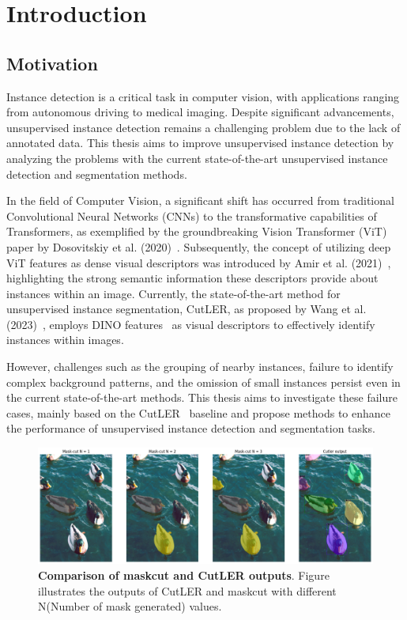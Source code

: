 \chapter{Introduction}\label{chap:introduction}

\section{Motivation}
Instance detection is a critical task in computer vision, with applications ranging from autonomous driving to medical imaging. Despite significant advancements, unsupervised instance detection remains a challenging problem due to the lack of annotated data. This thesis aims to improve unsupervised instance detection by analyzing the problems with the current state-of-the-art unsupervised instance detection and segmentation methods.

In the field of Computer Vision, a significant shift has occurred from traditional Convolutional Neural Networks (CNNs) to the transformative capabilities of Transformers, as exemplified by the groundbreaking Vision Transformer (ViT) paper by Dosovitskiy et al. (2020)~\cite{dosovitskiy2020image}. Subsequently, the concept of utilizing deep ViT features as dense visual descriptors was introduced by Amir et al. (2021)~\cite{amir2021deep}, highlighting the strong semantic information these descriptors provide about instances within an image. Currently, the state-of-the-art method for unsupervised instance segmentation, CutLER, as proposed by Wang et al. (2023)~\cite{wang2023cut}, employs DINO features~\cite{caron2021emerging} as visual descriptors to effectively identify instances within images.

However, challenges such as the grouping of nearby instances, failure to identify complex background patterns, and the omission of small instances persist even in the current state-of-the-art methods. This thesis aims to investigate these failure cases, mainly based on the CutLER~\cite{wang2023cut} baseline and propose methods to enhance the performance of unsupervised instance detection and segmentation tasks.

%
\begin{figure}
	\centering
	\includegraphics[width=1\textwidth]{Images/main/mask_cut_cutler_comparison.png}
	\caption[\textbf{Comparison of maskcut and CutLER outputs}]{\textbf{Comparison of maskcut and CutLER outputs}. Figure illustrates the outputs of CutLER and maskcut with different N(Number of mask generated) values.}
	\label{fig:mask_cut_cutler_comparison}
\end{figure}

